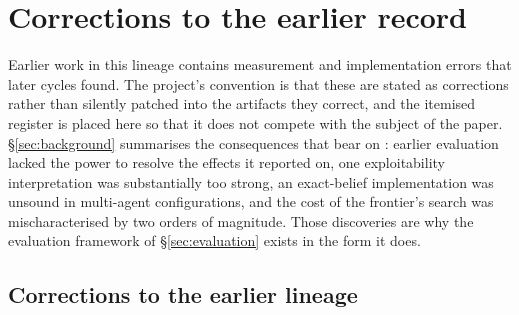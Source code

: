 \section{Corrections to the earlier record}
\label{app:corrections}

Earlier work in this lineage contains measurement and implementation errors that later cycles found.
The project's convention is that these are stated as corrections rather than silently patched into the
artifacts they correct, and the itemised register is placed here so that it does not compete with the
subject of the paper. \S\ref{sec:background} summarises the consequences that bear on
\sestina{}: earlier evaluation lacked the power to resolve the effects it reported on, one
exploitability interpretation was substantially too strong, an exact-belief implementation was unsound
in multi-agent configurations, and the cost of the frontier's search was mischaracterised by two
orders of magnitude. Those discoveries are why the evaluation framework of \S\ref{sec:evaluation}
exists in the form it does.

\subsection{Corrections to the earlier lineage}
\label{app:corrections-corpus}

